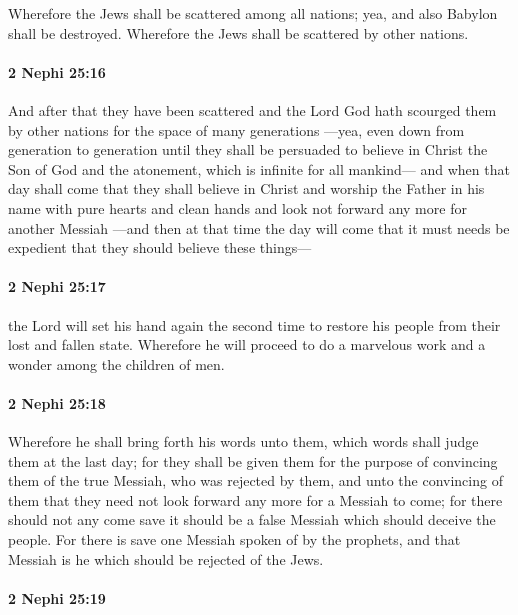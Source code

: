 			Wherefore the Jews shall be scattered among all nations;
			yea, and also Babylon shall be destroyed.
			Wherefore the Jews shall be scattered by other nations.

		\paragraph{2 Nephi 25:16} %
			\label{2NEPHI-25-16}

			And after that they have been scattered
			and the Lord God hath scourged them
			by other nations for the space of many generations
			---yea, even down from generation to generation
			until they shall be persuaded to believe in Christ the Son of God
			and the atonement, which is infinite for all mankind---
			and when that day shall come that they shall believe in Christ
			and worship the Father in his name with pure hearts and clean hands
			and look not forward any more for another Messiah
			---and then at that time the day will come
			that it must needs be expedient that they should believe these things---

		\paragraph{2 Nephi 25:17} %
			\label{2NEPHI-25-17}

			the Lord will set his hand again the second time
			to restore his people from their lost and fallen state.
			Wherefore he will proceed to do a marvelous work and a wonder
			among the children of men.

		\paragraph{2 Nephi 25:18} %
			\label{2NEPHI-25-18}

			Wherefore he shall bring forth his words unto them,
			which words shall judge them at the last day;
			for they shall be given them for the purpose of convincing them
			of the true Messiah, who was rejected by them,
			and unto the convincing of them
			that they need not look forward any more for a Messiah to come;
			for there should not any come save it should be a false Messiah
			which should deceive the people.
			For there is save one Messiah spoken of by the prophets,
			and that Messiah is he which should be rejected of the Jews.

		\paragraph{2 Nephi 25:19} %
			\label{2NEPHI-25-19}

